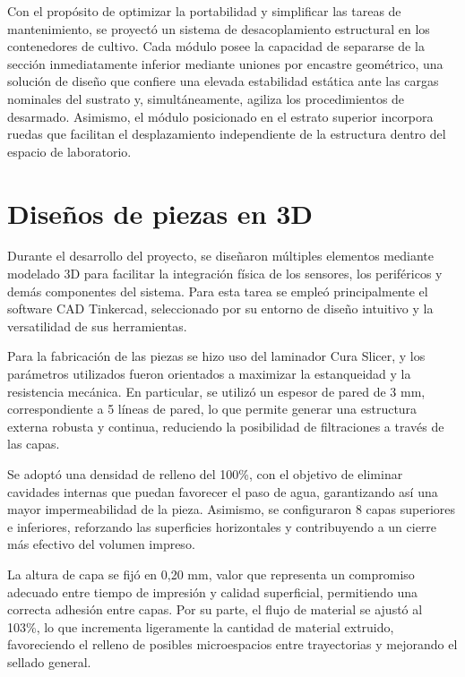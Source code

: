 Con el propósito de optimizar la portabilidad y simplificar las tareas de mantenimiento, se proyectó un sistema de desacoplamiento estructural en los contenedores de cultivo. Cada módulo posee la capacidad de separarse de la sección inmediatamente inferior mediante uniones por encastre geométrico, una solución de diseño que confiere una elevada estabilidad estática ante las cargas nominales del sustrato y, simultáneamente, agiliza los procedimientos de desarmado. Asimismo, el módulo posicionado en el estrato superior incorpora ruedas que facilitan el desplazamiento independiente de la estructura dentro del espacio de laboratorio.


\section{Diseños de piezas en 3D}
\label{sec:piezas_3d}

Durante el desarrollo del proyecto, se diseñaron múltiples elementos mediante modelado 3D para facilitar la integración física de los sensores, los periféricos y demás componentes del sistema. Para esta tarea se empleó principalmente el software CAD Tinkercad, seleccionado por su entorno de diseño intuitivo y la versatilidad de sus herramientas.

Para la fabricación de las piezas se hizo uso del laminador Cura Slicer, y los parámetros utilizados fueron orientados a maximizar la estanqueidad y la resistencia mecánica. En particular, se utilizó un espesor de pared de 3 mm, correspondiente a 5 líneas de pared, lo que permite generar una estructura externa robusta y continua, reduciendo la posibilidad de filtraciones a través de las capas.

Se adoptó una densidad de relleno del 100\%, con el objetivo de eliminar cavidades internas que puedan favorecer el paso de agua, garantizando así una mayor impermeabilidad de la pieza. Asimismo, se configuraron 8 capas superiores e inferiores, reforzando las superficies horizontales y contribuyendo a un cierre más efectivo del volumen impreso.

La altura de capa se fijó en 0,20 mm, valor que representa un compromiso adecuado entre tiempo de impresión y calidad superficial, permitiendo una correcta adhesión entre capas. Por su parte, el flujo de material se ajustó al 103\%, lo que incrementa ligeramente la cantidad de material extruido, favoreciendo el relleno de posibles microespacios entre trayectorias y mejorando el sellado general.

